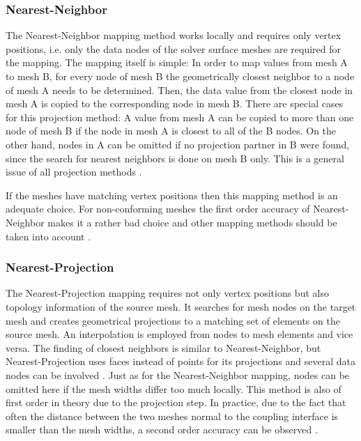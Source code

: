   \subsubsection{Nearest-Neighbor}\label{sec:Coupl-DataMapping-NN}
   The Nearest-Neighbor mapping method works locally and requires only vertex positions, i.e. only the data nodes of the solver surface meshes are required for the mapping. The mapping itself is simple: In order to map values from mesh A to mesh B, for every node of mesh B the geometrically closest neighbor to a node of mesh A needs to be determined. Then, the data value from the closest node in mesh A is copied to the corresponding node in mesh B. There are special cases for this projection method: A value from mesh A can be copied to more than one node of mesh B if the node in mesh A is closest to all of the B nodes. On the other hand, nodes in A can be omitted if no projection partner in B were found, since the search for nearest neighbors is done on mesh B only. This is a general issue of all projection methods \cite{gatzhammer2015efficient}.
   
   If the meshes have matching vertex positions then this mapping method is an adequate choice. For non-conforming meshes the first order accuracy of Nearest-Neighbor makes it a rather bad choice and other mapping methods should be taken into account \cite{bungartz2015fully}.
  
  \subsubsection{Nearest-Projection}\label{sec:Coupl-DataMapping-NP}
   The Nearest-Projection mapping requires not only vertex positions but also topology information of the source mesh. It searches for mesh nodes on the target mesh and creates geometrical projections to a matching set of elements on the source mesh. An interpolation is employed from nodes to mesh elements and vice versa. The finding of closest neighbors is similar to Nearest-Neighbor, but Nearest-Projection uses faces instead of points for its projections and several data nodes can be involved \cite{gatzhammer2015efficient}. Just as for the Nearest-Neighbor mapping, nodes can be omitted here if the mesh widths differ too much locally. This method is also of first order in theory due to the projection step. In practice, due to the fact that often the distance between the two meshes normal to the coupling interface is smaller than the mesh widths, a second order accuracy can be observed \cite{bungartz2015fully}.
  

